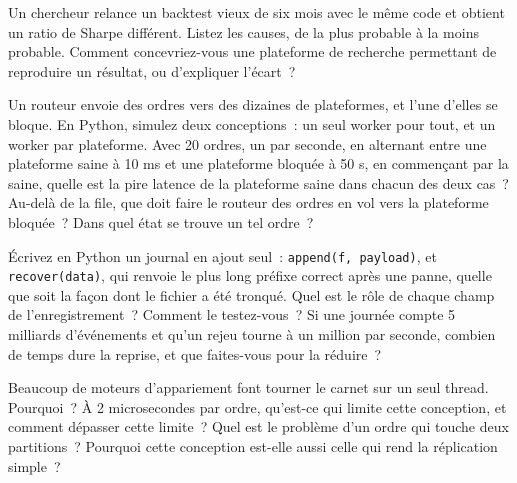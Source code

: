 \begin{question}\label{iq:iv3:system-design:28}
Un chercheur relance un backtest vieux de six mois avec le même code et obtient un ratio de Sharpe différent. Listez les causes, de la plus probable à la moins probable. Comment concevriez-vous une plateforme de recherche permettant de reproduire un résultat, ou d'expliquer l'écart~?
\end{question}

\begin{question}\label{iq:iv3:system-design:29}
Un routeur envoie des ordres vers des dizaines de plateformes, et l'une d'elles se bloque. En Python, simulez deux conceptions~: un seul worker pour tout, et un worker par plateforme. Avec 20 ordres, un par seconde, en alternant entre une plateforme saine à 10 ms et une plateforme bloquée à 50 s, en commençant par la saine, quelle est la pire latence de la plateforme saine dans chacun des deux cas~? Au-delà de la file, que doit faire le routeur des ordres en vol vers la plateforme bloquée~? Dans quel état se trouve un tel ordre~?
\end{question}

\begin{question}\label{iq:iv3:system-design:30}
Écrivez en Python un journal en ajout seul~: \texttt{append(f, payload)}, et \texttt{recover(data)}, qui renvoie le plus long préfixe correct après une panne, quelle que soit la façon dont le fichier a été tronqué. Quel est le rôle de chaque champ de l'enregistrement~? Comment le testez-vous~? Si une journée compte 5 milliards d'événements et qu'un rejeu tourne à un million par seconde, combien de temps dure la reprise, et que faites-vous pour la réduire~?
\end{question}

\begin{question}\label{iq:iv3:system-design:31}
Beaucoup de moteurs d'appariement font tourner le carnet sur un seul thread. Pourquoi~? À 2 microsecondes par ordre, qu'est-ce qui limite cette conception, et comment dépasser cette limite~? Quel est le problème d'un ordre qui touche deux partitions~? Pourquoi cette conception est-elle aussi celle qui rend la réplication simple~?
\end{question}

